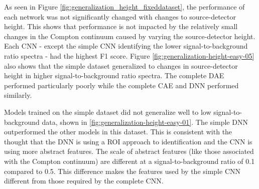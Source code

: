 As seen in Figure \ref{fig:generalization_height_fixeddataset}, the performance of each network was not significantly changed with changes to source-detector height. This shows that performance is not impacted by the relatively small changes in the Compton continuum caused by varying the source-detector height. Each CNN - except the simple CNN identifying the lower signal-to-background ratio spectra - had the highest F1 score. Figure \ref{fig:generalization-height-easy-05} also shows that the simple dataset generalized to changes in source-detector height in higher signal-to-background ratio spectra. The complete DAE performed particularly poorly while the complete CAE and DNN performed similarly.

Models trained on the simple dataset did not generalize well to low signal-to-background data, shown in \ref{fig:generalization-height-easy-01}. The simple DNN outperformed the other models in this dataset. This is consistent with the thought that the DNN is using a ROI approach to identification and the CNN is using more abstract features. The scale of abstract features (like those associated with the Compton continuum) are different at a signal-to-background ratio of 0.1 compared to 0.5. This difference makes the features used by the simple CNN different from those required by the complete CNN.


